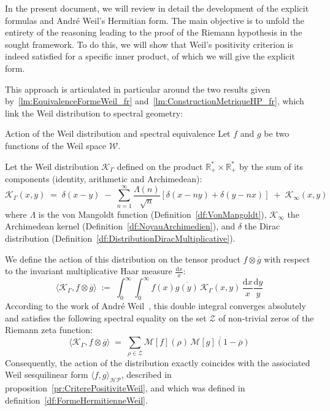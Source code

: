 \documentclass[Riemann_Hypothesis.tex]{subfiles}
\begin{document}
In the present document, we will review in detail the development of the 
explicit formulas and André Weil's Hermitian form. The main objective 
is to unfold the entirety of the reasoning leading to the proof of the 
Riemann hypothesis in the sought framework. To do this, 
we will show that Weil's positivity criterion 
is indeed satisfied for a specific inner product, of which we will 
give the explicit form.

This approach is articulated in particular around the two results given 
by~\ref{lm:EquivalenceFormeWeil_fr} and~\ref{lm:ConstructionMetriqueHP_fr}, 
which link the Weil distribution to spectral geometry:

\begin{lemmaEn}[label=lm:EquivalenceFormeWeil_intro]{Action of the Weil distribution and spectral equivalence}
    Let $f$ and $g$ be two functions of the Weil space $\mathcal{W}$. \par
    Let the Weil distribution $\mathcal{K}_{\Gamma}$ defined on the product $\mathbb{R}_+^* \times \mathbb{R}_+^*$ by the sum of its components (identity, arithmetic and Archimedean):
    \begin{equation*}
        \mathcal{K}_{\Gamma}(x,y) \;=\; \delta(x-y) \;-\; \sum_{n=1}^{\infty} \frac{\Lambda(n)}{\sqrt{n}} \left[ \delta\left(x - ny\right) + \delta\left(y - nx\right) \right] \;+\; \mathcal{K}_{\infty}(x,y)
    \end{equation*}
    where $\Lambda$ is the von Mangoldt function (Definition~\ref{df:VonMangoldt}), 
    $\mathcal{K}_{\infty}$ the Archimedean kernel (Definition~\ref{df:NoyauArchimedien}), 
    and $\delta$ the Dirac distribution 
    (Definition~\ref{df:DistributionDiracMultiplicative}). \par
    We define the action of this distribution on the tensor product $f \otimes \overline{g}$ with respect to the invariant multiplicative Haar measure $\frac{\mathrm{d}x}{x}$:
    \begin{equation*}
        \langle \mathcal{K}_{\Gamma}, f \otimes \overline{g} \rangle \;:=\; \int_{0}^{\infty} \int_{0}^{\infty} f(x) \overline{g(y)} \, \mathcal{K}_{\Gamma}(x,y) \, \frac{\mathrm{d}x}{x} \frac{\mathrm{d}y}{y}
    \end{equation*}
    According to the work of André Weil~\cite{weil1952_formules_en}, this double integral converges absolutely and satisfies the following spectral equality on the set $\mathcal{Z}$ of non-trivial zeros of the Riemann zeta function:
    \begin{equation*}
        \langle \mathcal{K}_{\Gamma}, f \otimes \overline{g} \rangle \;=\; \sum_{\rho \in \mathcal{Z}} \mathcal{M}[f](\rho) \, \overline{\mathcal{M}[g](1 - \overline{\rho})}
    \end{equation*}
    Consequently, the action of the distribution exactly coincides with the associated
    Weil sesquilinear form $\langle f, g \rangle_{\mathcal{HP}}$,
    described in
    {proposition}~\ref{pr:CriterePositiviteWeil},
    and which was defined in definition~\ref{df:FormeHermitienneWeil}.
\end{lemmaEn}
\end{document}
